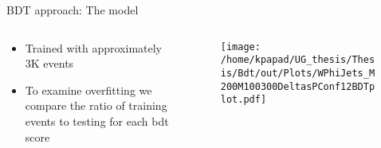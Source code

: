 \documentclass[bigger]{beamer}
\begin{document}
\begin{frame}[label={sec:org6bc66eb}]{BDT approach: The model}
\begin{columns}
\begin{column}{0.5\columnwidth}
\begin{itemize}
\item Trained with approximately 3K events
\item To examine overfitting we compare the ratio of training events to testing for each bdt score
\end{itemize}
\end{column}
\begin{column}{0.5\columnwidth}
  \begin{figure}[h!]
\centering
\texttt{[image: /home/kpapad/UG\_thesis/Thesis/Bdt/out/Plots/WPhiJets\_M200M100300DeltasPConf12BDTplot.pdf]}
\end{figure}
\end{column}
\end{columns}
\end{frame}
\end{document}

